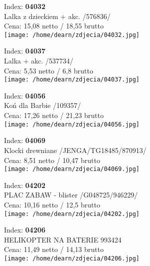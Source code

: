 {Index: \textbf{04032}\\
Lalka z dzieckiem + akc. /576836/\\
Cena: 15,08 netto / 18,55 brutto\\
  \texttt{[image: /home/dearn/zdjecia/04032.jpg]}}\newline\newline

{Index: \textbf{04037}\\
Lalka + akc.  /537734/\\
Cena: 5,53 netto / 6,8 brutto\\
  \texttt{[image: /home/dearn/zdjecia/04037.jpg]}}\newline\newline

{Index: \textbf{04056}\\
Koń dla Barbie /109357/\\
Cena: 17,26 netto / 21,23 brutto\\
  \texttt{[image: /home/dearn/zdjecia/04056.jpg]}}\newline\newline

{Index: \textbf{04069}\\
Klocki drewniane /JENGA/TG18485/870913/\\
Cena: 8,51 netto / 10,47 brutto\\
  \texttt{[image: /home/dearn/zdjecia/04069.jpg]}}\newline\newline

{Index: \textbf{04202}\\
PLAC ZABAW - blister /G048725/946229/\\
Cena: 10,16 netto / 12,5 brutto\\
  \texttt{[image: /home/dearn/zdjecia/04202.jpg]}}\newline\newline

{Index: \textbf{04206}\\
HELIKOPTER NA BATERIE                        993424\\
Cena: 11,49 netto / 14,13 brutto\\
  \texttt{[image: /home/dearn/zdjecia/04206.jpg]}}\newline\newline

